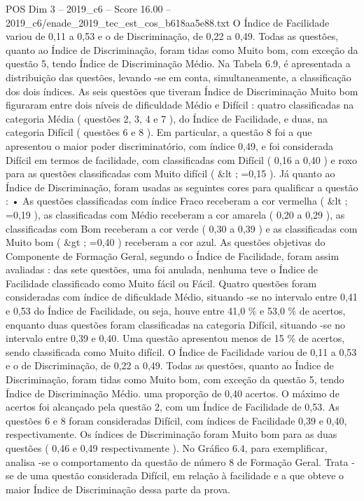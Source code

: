 \begin{textsample}{POS Dim 3 – 2019\_c6 – Score 16.00 – 2019\_c6/enade\_2019\_tec\_est\_cos\_b618aa5e88.txt}
O Índice de Facilidade variou de 0,11 a 0,53 e o de Discriminação, de 0,22 a 0,49.
Todas as questões, quanto ao Índice de Discriminação, foram tidas como Muito bom, com exceção da questão 5, tendo Índice de Discriminação Médio.
Na Tabela 6.9, é apresentada a distribuição das questões, levando -se em conta, simultaneamente, a classificação dos dois índices.
As seis questões que tiveram Índice de Discriminação Muito bom figuraram entre dois níveis de dificuldade Médio e Difícil : quatro classificadas na categoria Média ( questões 2, 3, 4 e 7 ), do Índice de Facilidade, e duas, na categoria Difícil ( questões 6 e 8 ).
Em particular, a questão 8 foi a que apresentou o maior poder discriminatório, com índice 0,49, e foi considerada Difícil em termos de facilidade, com classificadas com Difícil ( 0,16 a 0,40 ) e roxo para as questões classificadas com Muito difícil ( \&lt ; =0,15 ).
Já quanto ao Índice de Discriminação, foram usadas as seguintes cores para qualificar a questão : • As questões classificadas com índice Fraco receberam a cor vermelha ( \&lt ; =0,19 ), as classificadas com Médio receberam a cor amarela ( 0,20 a 0,29 ), as classificadas com Bom receberam a cor verde ( 0,30 a 0,39 ) e as classificadas com Muito bom ( \&gt ; =0,40 ) receberam a cor azul.
As questões objetivas do Componente de Formação Geral, segundo o Índice de Facilidade, foram assim avaliadas : das sete questões, uma foi anulada, nenhuma teve o Índice de Facilidade classificado como Muito fácil ou Fácil.
Quatro questões foram consideradas com índice de dificuldade Médio, situando -se no intervalo entre 0,41 e 0,53 do Índice de Facilidade, ou seja, houve entre 41,0 \% e 53,0 \% de acertos, enquanto duas questões foram classificadas na categoria Difícil, situando -se no intervalo entre 0,39 e 0,40.
Uma questão apresentou menos de 15 \% de acertos, sendo classificada como Muito difícil.
O Índice de Facilidade variou de 0,11 a 0,53 e o de Discriminação, de 0,22 a 0,49.
Todas as questões, quanto ao Índice de Discriminação, foram tidas como Muito bom, com exceção da questão 5, tendo Índice de Discriminação Médio. uma proporção de 0,40 acertos.
O máximo de acertos foi alcançado pela questão 2, com um Índice de Facilidade de 0,53.
As questões 6 e 8 foram consideradas Difícil, com índices de Facilidade 0,39 e 0,40, respectivamente.
Os índices de Discriminação foram Muito bom para as duas questões ( 0,46 e 0,49 respectivamente ).
No Gráfico 6.4, para exemplificar, analisa -se o comportamento da questão de número 8 de Formação Geral.
Trata -se de uma questão considerada Difícil, em relação à facilidade e a que obteve o maior Índice de Discriminação dessa parte da prova.

\end{textsample}
